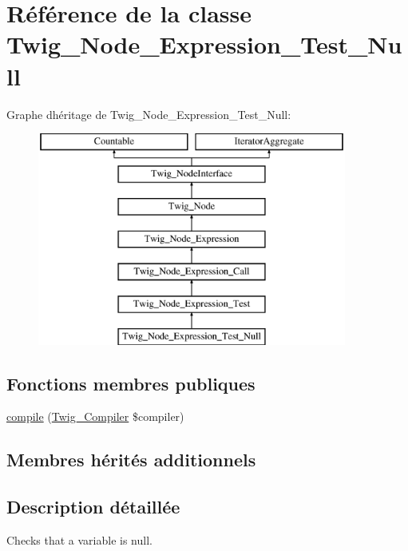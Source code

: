 \hypertarget{class_twig___node___expression___test___null}{}\section{Référence de la classe Twig\+\_\+\+Node\+\_\+\+Expression\+\_\+\+Test\+\_\+\+Null}
\label{class_twig___node___expression___test___null}
Graphe d\textquotesingle{}héritage de Twig\+\_\+\+Node\+\_\+\+Expression\+\_\+\+Test\+\_\+\+Null\+:\begin{figure}[H]
\begin{center}
\leavevmode
\includegraphics[height=7.000000cm]{class_twig___node___expression___test___null}
\end{center}
\end{figure}
\subsection*{Fonctions membres publiques}
\begin{DoxyCompactItemize}
\item 
\hyperlink{class_twig___node___expression___test___null_a4e0faa87c3fae583620b84d3607085da}{compile} (\hyperlink{class_twig___compiler}{Twig\+\_\+\+Compiler} \$compiler)
\end{DoxyCompactItemize}
\subsection*{Membres hérités additionnels}


\subsection{Description détaillée}
Checks that a variable is null.


